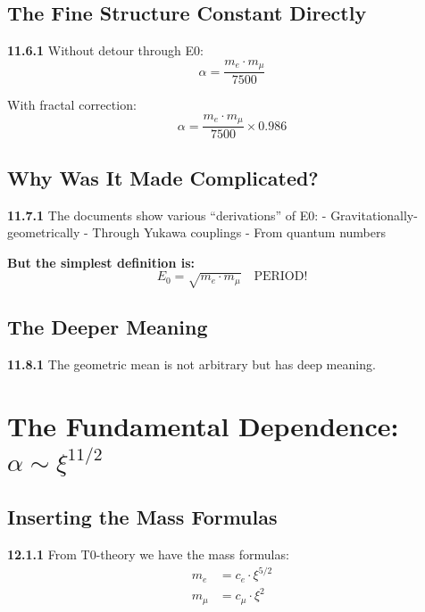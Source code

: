 \subsection{The Fine Structure Constant Directly}

\begin{tcolorbox}[colback=green!5!white,colframe=green!75!black,title=\textbf{The Most Direct Formula}]
	\noindent \textbf{11.6.1} Without detour through E0:
	\begin{equation}
		\boxed{\alpha = \frac{m_e \cdot m_\mu}{7500}}
	\end{equation}
	
	With fractal correction:
	\begin{equation}
		\boxed{\alpha = \frac{m_e \cdot m_\mu}{7500} \times 0.986}
	\end{equation}
\end{tcolorbox}

\subsection{Why Was It Made Complicated?}

\noindent \textbf{11.7.1} The documents show various ``derivations'' of E0:
- Gravitationally-geometrically
- Through Yukawa couplings
- From quantum numbers

\textbf{But the simplest definition is:}
\begin{equation}
	\boxed{E_0 = \sqrt{m_e \cdot m_\mu} \quad \text{PERIOD!}}
\end{equation}

\subsection{The Deeper Meaning}

\noindent \textbf{11.8.1} The geometric mean is not arbitrary but has deep meaning.

\section{The Fundamental Dependence: $\alpha \sim \xi^{11/2}$}

\subsection{Inserting the Mass Formulas}

\noindent \textbf{12.1.1} From T0-theory we have the mass formulas:
\begin{align}
	m_e &= c_e \cdot \xi^{5/2} \\
	m_\mu &= c_\mu \cdot \xi^2
\end{align}

